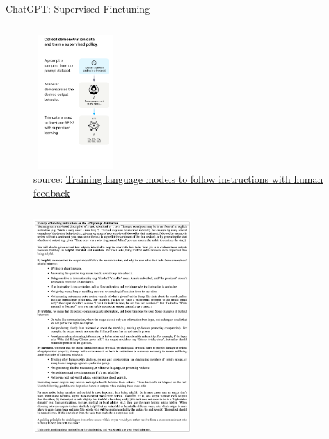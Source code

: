 \documentclass[9pt]{beamer}
\begin{document}
\begin{frame}{ChatGPT: Supervised Finetuning}
    \begin{column}{0.50\textwidth}
        \begin{figure}
            \centering
            \includegraphics[width = 3.2cm, height=5.1cm]{img/sft-chatgpt.png}
            \caption{source: \href{phttps://arxiv.org/pdf/2106.09685.pdf}{Training language models to follow instructions with human feedback}}
            \label{fig:enter-label}
        \end{figure}
    \end{column}
    \begin{column}{0.50\textwidth}
        \begin{figure}
            \centering
            \includegraphics[width = 6.0cm, height=8.2cm]{img/sft-chatgpt-instructions.png}
            \label{fig:enter-label}
        \end{figure}
    \end{column}
\end{frame}
\end{document}
